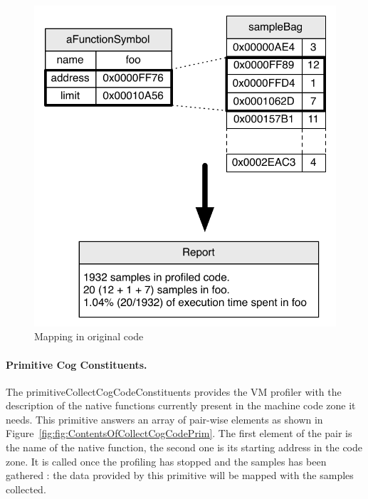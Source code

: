 \documentclass[10pt,preprint]{sigplanconf}
\newcommand{\figlabel}[1]{\label{fig:#1}}
\newcommand{\figref}[1]{Figure~\ref{fig:#1}}
\begin{document}
 \begin{figure}[!htp]
     \begin{center}
         \includegraphics[width=0.9\linewidth]{OriginalMapping}
         \caption{Mapping in original code}
         \figlabel{fig:OriginalMapping}
     \end{center}
 \end{figure}
 
 
 \paragraph{Primitive Cog Constituents.}
The primitiveCollectCogCodeConstituents provides the VM profiler with the description of the native functions currently present in the machine code zone it needs. 
This primitive answers an array of pair-wise elements as shown in \figref{fig:ContentsOfCollectCogCodePrim}. The first element of the pair is the name of the native function, the second one is its starting address in the code zone.
It is called once the profiling has stopped and the samples has been gathered : the data provided by this primitive will be mapped with the samples collected.
\end{document}
